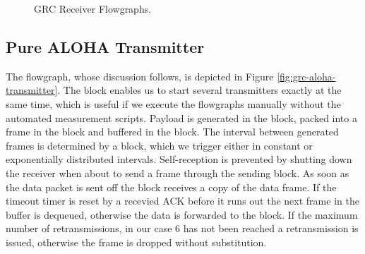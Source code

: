 \begin{figure}
	\begin{center}
		\label{fig:grc-receiver}
		\vskip 40pt
		\label{fig:grc-sniffer}
	\end{center}
	\caption{GRC Receiver Flowgraphs.}
\end{figure}

\subsection{Pure ALOHA Transmitter}
\label{sec:aloha-transmitter}

The flowgraph, whose discussion follows, is depicted in Figure \ref{fig:grc-aloha-transmitter}. The  block enables us to start several transmitters exactly at the same time, which is useful if we execute the flowgraphs manually without the automated measurement scripts. Payload is generated in the  block, packed into a frame in the  block and buffered in the  block. The interval between generated frames is determined by a  block, which we trigger either in constant or exponentially distributed intervals. Self-reception is prevented by shutting down the receiver when about to send a frame through the sending block. As soon as the data packet is sent off the  block receives a copy of the data frame. If the timeout timer is reset by a recevied ACK before it runs out the next frame in the buffer is dequeued, otherwise the data is forwarded to the  block. If the maximum number of retransmissions, in our case 6 has not been reached a retransmission is issued, otherwise the frame is dropped without substitution.

